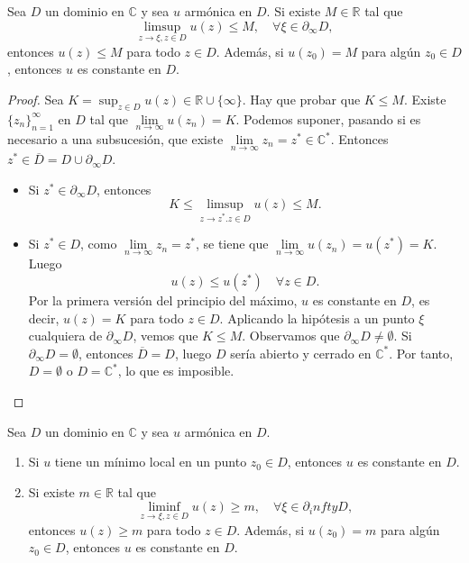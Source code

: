 \begin{theorem}
    Sea $D$ un dominio en $\mathbb{C}$ y sea $u$ armónica en $D$.
    Si existe $M \in \mathbb{R}$ tal que
    $$\limsup_{z \to \xi, z \in D} u(z) \leq M, \quad \forall \xi \in \partial_\infty D,$$
    entonces $u(z) \leq M$ para todo $z \in D$.
    Además, si $u(z_0) = M$ para algún $z_0 \in D$, entonces $u$ es constante en $D$.
\end{theorem}

\begin{proof}
    Sea $K = \sup_{z \in D} u(z) \in \mathbb{R} \cup \{\infty\}$.
    Hay que probar que $K \leq M$.
    Existe $\{z_n\}_{n=1}^\infty$ en $D$ tal que $\lim\limits_{n \to \infty} u(z_n) = K$.
    Podemos suponer, pasando si es necesario a una subsucesión, que existe $\lim\limits_{n \to \infty} z_n = z^\ast \in \mathbb{C}^\ast$.
    Entonces $z^\ast \in \overline{D} = D \cup \partial_\infty D$.
    \begin{itemize}
        \item Si $z^\ast \in \partial_\infty D$, entonces
              $$K \leq \limsup_{z \to z^\ast. z \in D} u(z) \leq M.$$
        \item Si $z^\ast \in D$, como $\lim\limits_{n \to \infty} z_n = z^\ast$, se tiene que $\lim\limits_{n \to \infty} u(z_n) = u(z^\ast) = K$.
              Luego
              $$u(z) \leq u(z^\ast) \quad \forall z \in D.$$
              Por la primera versión del principio del máximo, $u$ es constante en $D$, es decir, $u(z) = K$ para todo $z \in D$.
              Aplicando la hipótesis a un punto $\xi$ cualquiera de $\partial_\infty D$, vemos que $K \leq M$.
              Observamos que $\partial_\infty D \neq \emptyset$.
              Si $\partial_\infty D = \emptyset$, entonces $\overline{D} = D$, luego $D$ sería abierto y cerrado en $\mathbb{C}^\ast$.
              Por tanto, $D = \emptyset$ o $D = \mathbb{C}^\ast$, lo que es imposible.
    \end{itemize}
\end{proof}

\begin{theorem}
    Sea $D$ un dominio en $\mathbb{C}$ y sea $u$ armónica en $D$.
    \begin{enumerate}
        \item Si $u$ tiene un mínimo local en un punto $z_0 \in D$, entonces $u$ es constante en $D$.
        \item Si existe $m \in \mathbb{R}$ tal que
              $$\liminf_{z \to \xi, z \in D} u(z) \geq m, \quad \forall \xi \in \partial_infty D,$$
              entonces $u(z) \geq m$ para todo $z \in D$.
              Además, si $u(z_0) = m$ para algún $z_0 \in D$, entonces $u$ es constante en $D$.
    \end{enumerate}
\end{theorem}

